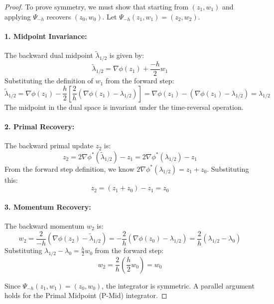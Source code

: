 \documentclass[11pt,a4paper]{article}
\begin{document}
\begin{proof}
To prove symmetry, we must show that starting from $(z_1, w_1)$ and applying $\Psi_{-h}$ recovers $(z_0, w_0)$. Let $\Psi_{-h}(z_1, w_1) = (z_2, w_2)$.

\paragraph{1. Midpoint Invariance:}
The backward dual midpoint $\tilde{\lambda}_{1/2}$ is given by:
\begin{equation}
    \tilde{\lambda}_{1/2} = \nabla \phi(z_1) + \frac{-h}{2}w_1
\end{equation}
Substituting the definition of $w_1$ from the forward step:
\begin{equation}
    \tilde{\lambda}_{1/2} = \nabla \phi(z_1) - \frac{h}{2} \left[ \frac{2}{h}(\nabla \phi(z_1) - \lambda_{1/2}) \right] = \nabla \phi(z_1) - (\nabla \phi(z_1) - \lambda_{1/2}) = \lambda_{1/2}
\end{equation}
The midpoint in the dual space is invariant under the time-reversal operation.

\paragraph{2. Primal Recovery:}
The backward primal update $z_2$ is:
\begin{equation}
    z_2 = 2\nabla \phi^*(\tilde{\lambda}_{1/2}) - z_1 = 2\nabla \phi^*(\lambda_{1/2}) - z_1
\end{equation}
From the forward step definition, we know $2\nabla \phi^*(\lambda_{1/2}) = z_1 + z_0$. Substituting this:
\begin{equation}
    z_2 = (z_1 + z_0) - z_1 = z_0
\end{equation}

\paragraph{3. Momentum Recovery:}
The backward momentum $w_2$ is:
\begin{equation}
    w_2 = \frac{2}{-h}(\nabla \phi(z_2) - \tilde{\lambda}_{1/2}) = -\frac{2}{h}(\nabla \phi(z_0) - \lambda_{1/2}) = \frac{2}{h}(\lambda_{1/2} - \lambda_0)
\end{equation}
Substituting $\lambda_{1/2} - \lambda_0 = \frac{h}{2}w_0$ from the forward step:
\begin{equation}
    w_2 = \frac{2}{h} \left( \frac{h}{2}w_0 \right) = w_0
\end{equation}

Since $\Psi_{-h}(z_1, w_1) = (z_0, w_0)$, the integrator is symmetric. A parallel argument holds for the Primal Midpoint (P-Mid) integrator.
\end{proof}
\end{document}

